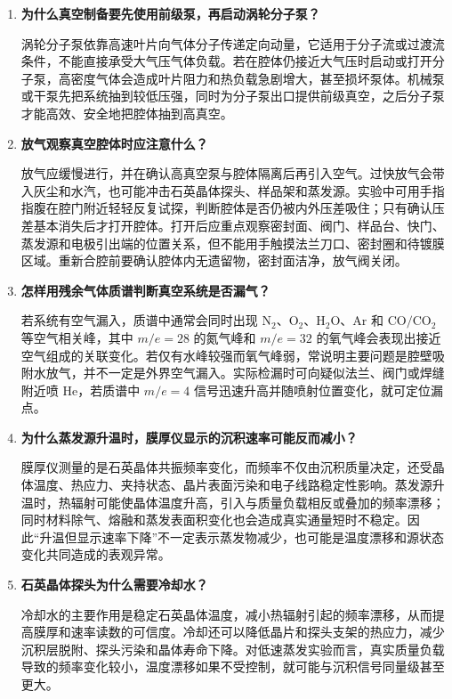\documentclass[11pt]{article}
\begin{document}
\begin{enumerate}
    \item \textbf{为什么真空制备要先使用前级泵，再启动涡轮分子泵？}

    涡轮分子泵依靠高速叶片向气体分子传递定向动量，它适用于分子流或过渡流条件，不能直接承受大气压气体负载。若在腔体仍接近大气压时启动或打开分子泵，高密度气体会造成叶片阻力和热负载急剧增大，甚至损坏泵体。机械泵或干泵先把系统抽到较低压强，同时为分子泵出口提供前级真空，之后分子泵才能高效、安全地把腔体抽到高真空。

    \item \textbf{放气观察真空腔体时应注意什么？}

    放气应缓慢进行，并在确认高真空泵与腔体隔离后再引入空气。过快放气会带入灰尘和水汽，也可能冲击石英晶体探头、样品架和蒸发源。实验中可用手指指腹在腔门附近轻轻反复试探，判断腔体是否仍被内外压差吸住；只有确认压差基本消失后才打开腔体。打开后应重点观察密封面、阀门、样品台、快门、蒸发源和电极引出端的位置关系，但不能用手触摸法兰刀口、密封圈和待镀膜区域。重新合腔前要确认腔体内无遗留物，密封面洁净，放气阀关闭。

    \item \textbf{怎样用残余气体质谱判断真空系统是否漏气？}

    若系统有空气漏入，质谱中通常会同时出现 $\mathrm{N_2}$、$\mathrm{O_2}$、$\mathrm{H_2O}$、$\mathrm{Ar}$ 和 $\mathrm{CO/CO_2}$ 等空气相关峰，其中 $m/e=28$ 的氮气峰和 $m/e=32$ 的氧气峰会表现出接近空气组成的关联变化。若仅有水峰较强而氧气峰弱，常说明主要问题是腔壁吸附水放气，并不一定是外界空气漏入。实际检漏时可向疑似法兰、阀门或焊缝附近喷 He，若质谱中 $m/e=4$ 信号迅速升高并随喷射位置变化，就可定位漏点。

    \item \textbf{为什么蒸发源升温时，膜厚仪显示的沉积速率可能反而减小？}

    膜厚仪测量的是石英晶体共振频率变化，而频率不仅由沉积质量决定，还受晶体温度、热应力、夹持状态、晶片表面污染和电子线路稳定性影响。蒸发源升温时，热辐射可能使晶体温度升高，引入与质量负载相反或叠加的频率漂移；同时材料除气、熔融和蒸发表面积变化也会造成真实通量短时不稳定。因此“升温但显示速率下降”不一定表示蒸发物减少，也可能是温度漂移和源状态变化共同造成的表观异常。

    \item \textbf{石英晶体探头为什么需要冷却水？}

    冷却水的主要作用是稳定石英晶体温度，减小热辐射引起的频率漂移，从而提高膜厚和速率读数的可信度。冷却还可以降低晶片和探头支架的热应力，减少沉积层脱附、探头污染和晶体寿命下降。对低速蒸发实验而言，真实质量负载导致的频率变化较小，温度漂移如果不受控制，就可能与沉积信号同量级甚至更大。


\end{enumerate}
\end{document}
